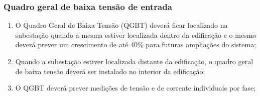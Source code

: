\subsubsection{Quadro geral de baixa tensão de entrada}

\begin{enumerate}
	\item O Quadro Geral de Baixa Tensão (QGBT) deverá ficar localizado na subestação quando a mesma estiver localizada dentro da edificação e o mesmo deverá prever um crescimento de até 40\% para futuras ampliações do sistema;
	\item Quando a subestação estiver localizada distante da edificação, o quadro geral de baixa tensão deverá ser instalado no interior da edificação;
	\item O QGBT deverá prever medições de tensão e de corrente individuais por fase;

\end{enumerate}
